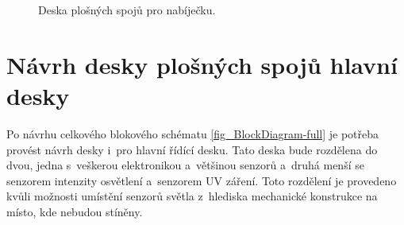 \begin{figure}[h]
    \centering
    \quad
    \caption{Deska plošných spojů pro nabíječku.}
    \label{fig_chargerBoardKiCad}
\end{figure}

\section{Návrh desky plošných spojů hlavní desky}

Po návrhu celkového blokového schématu \ref{fig_BlockDiagram-full} je potřeba provést návrh desky i~pro hlavní řídící desku. Tato deska bude rozdělena do dvou, jedna s~veškerou elektronikou a~většinou senzorů a~druhá menší se senzorem intenzity osvětlení a~senzorem UV záření. Toto rozdělení je provedeno kvůli možnosti umístění senzorů světla z~hlediska mechanické konstrukce na místo, kde nebudou stíněny. 

